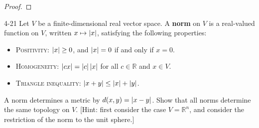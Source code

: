 \begin{proof}
\end{proof}

\begin{problem}{4-21}
Let $V$ be a finite-dimensional real vector space. A \textbf{norm} on $V$ is a real-valued function on $V$, written $x\mapsto \left\vert{x}\right\vert$, satisfying the following properties:
\begin{itemize}
	\item \textsc{Positivity}: $\left\vert{x}\right\vert \geq 0$, and $\left\vert{x}\right\vert = 0$ if and only if $x = 0$.
	\item \textsc{Homogeneity}: $\left\vert{cx}\right\vert = \left\vert{c}\right\vert\left\vert{x}\right\vert$ for all $c\in \mathbb{R}$ and $x\in V$.
	\item \textsc{Triangle inequality}: $\left\vert{x + y}\right\vert \leq \left\vert{x}\right\vert + \left\vert{y}\right\vert$.
\end{itemize}

A norm determines a metric by $d(x, y) = \left\vert{x - y}\right\vert$. Show that all norms determine the same topology on $V$. [Hint: first consider the case $V = \mathbb{R}^{n}$, and consider the restriction of the norm to the unit sphere.]
\end{problem}

